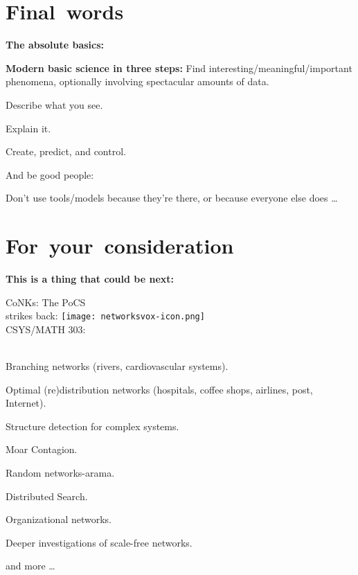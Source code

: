 \section{Final\ words}
  \small

  \textbf{The absolute basics:}

  \textbf{Modern basic science in three steps:}
      Find interesting/meaningful/important phenomena,
      optionally involving spectacular amounts of data.
    
      Describe what you see.
    
      Explain it.
  
    Create, predict, and control.
  
    And be good people: 
  
    Don't use tools/models because they're there,
    or because everyone else does \ldots
\section{For\ your\ consideration}
  \small
  \textbf{This is a thing that could be next:}
    
      CoNKs: The PoCS\\ strikes back:
      \smallskip
      \texttt{[image: networksvox-icon.png]}\\
      \smallskip
      CSYS/MATH 303: \\
      \\
       
        Branching networks (rivers, cardiovascular systems).
       
        Optimal (re)distribution networks (hospitals, coffee shops, airlines, post, Internet).
       
        Structure detection for complex systems.
       
        Moar Contagion.
       
        Random networks-arama.
       
        Distributed Search.
       
        Organizational networks.
       
        Deeper investigations of scale-free networks.
       
        and more \ldots
  
